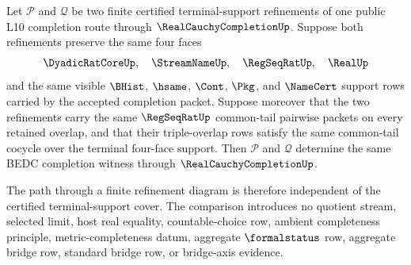 \begin{theorem}
\label{thm:real-cauchy-completion-terminal-support-refinement-cocycle}
Let $\mathcal P$ and $\mathcal Q$ be two finite certified terminal-support refinements of one public L10 completion route through $\RealCauchyCompletionUp$. Suppose both refinements preserve the same four faces
$$
\DyadicRatCoreUp,\quad \StreamNameUp,\quad \RegSeqRatUp,\quad \RealUp
$$
and the same visible $\BHist$, $\hsame$, $\Cont$, $\Pkg$, and $\NameCert$ support rows carried by the accepted completion packet. Suppose moreover that the two refinements carry the same $\RegSeqRatUp$ common-tail pairwise packets on every retained overlap, and that their triple-overlap rows satisfy the same common-tail cocycle over the terminal four-face support. Then $\mathcal P$ and $\mathcal Q$ determine the same BEDC completion witness through $\RealCauchyCompletionUp$.

The path through a finite refinement diagram is therefore independent of the certified terminal-support cover. The comparison introduces no quotient stream, selected limit, host real equality, countable-choice row, ambient completeness principle, metric-completeness datum, aggregate $\formalstatus$ row, aggregate bridge row, standard bridge row, or bridge-axis evidence.
\end{theorem}
